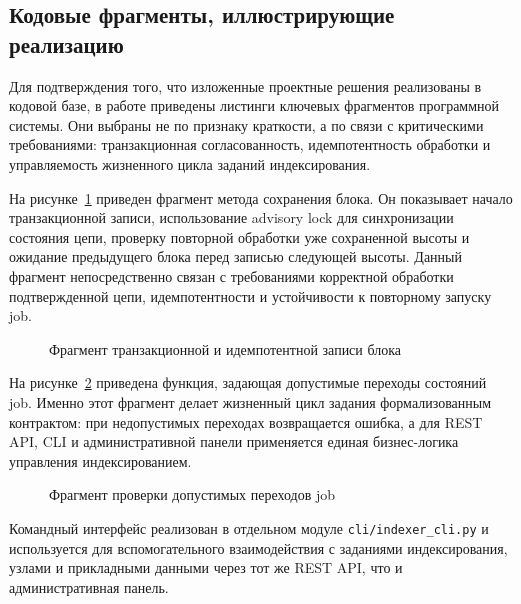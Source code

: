 \subsection{Кодовые фрагменты, иллюстрирующие реализацию}

Для подтверждения того, что изложенные проектные решения реализованы в кодовой
базе, в работе приведены листинги ключевых фрагментов программной системы.
Они выбраны не по признаку краткости, а по связи с критическими требованиями:
транзакционная согласованность, идемпотентность обработки и управляемость
жизненного цикла заданий индексирования.

На рисунке~\ref{src:src1} приведен фрагмент метода сохранения блока. Он
показывает начало транзакционной записи, использование advisory lock для
синхронизации состояния цепи, проверку повторной обработки уже сохраненной
высоты и ожидание предыдущего блока перед записью следующей высоты. Данный
фрагмент непосредственно связан с требованиями корректной обработки
подтвержденной цепи, идемпотентности и устойчивости к повторному запуску job.

\begin{figure}

\caption{Фрагмент транзакционной и идемпотентной записи блока}
\label{src:src1}
\end{figure}

На рисунке~\ref{src:src2} приведена функция, задающая допустимые переходы
состояний job. Именно этот фрагмент делает жизненный цикл задания
формализованным контрактом: при недопустимых переходах возвращается ошибка, а для REST API,
CLI и административной панели применяется единая бизнес-логика управления
индексированием.

\begin{figure}

\caption{Фрагмент проверки допустимых переходов job}
\label{src:src2}
\end{figure}

Командный интерфейс реализован в отдельном модуле \texttt{cli/indexer\_cli.py}
и используется для вспомогательного взаимодействия с заданиями индексирования,
узлами и прикладными данными через тот же REST API, что и административная
панель.
